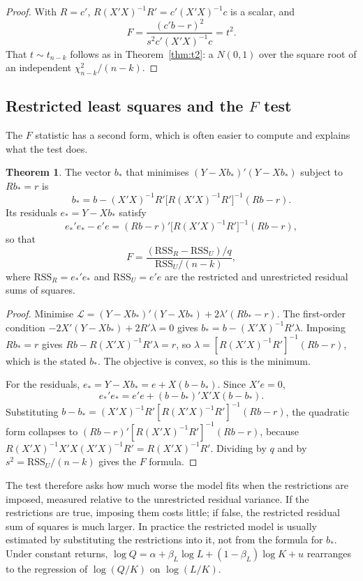 \documentclass[11pt,a4paper]{article}
\numberwithin{equation}{section}
\theoremstyle{definition}
\newtheorem{thm}{Theorem}[subsection]
\begin{document}
\begin{proof}
With $R = c'$, $R(X'X)^{-1}R' = c'(X'X)^{-1}c$ is a scalar, and
\[
F = \frac{(c'b - r)^2}{s^2c'(X'X)^{-1}c} = t^2 .
\]
 That $t \sim t_{n-k}$ follows as in
Theorem~\ref{thm:t2}: a $N(0, 1)$ over the square root of an independent $\chi^2_{n-k}/(n - k)$.
\end{proof}

\subsection{Restricted least squares and the $F$ test}
\label{ssec:restricted}

The $F$ statistic has a second form, which is often easier to compute and explains what the test does.

\begin{thm}
\label{thm:rls}
The vector $b_*$ that minimises $(Y - Xb_*)'(Y - Xb_*)$ subject to $Rb_* = r$ is
\[
b_* = b - (X'X)^{-1}R'\bigl[R(X'X)^{-1}R'\bigr]^{-1}(Rb - r) .
\]
Its residuals $e_* = Y - Xb_*$ satisfy
\[
e_*'e_* - e'e = (Rb - r)'\bigl[R(X'X)^{-1}R'\bigr]^{-1}(Rb - r) ,
\]
so that
\[
F = \frac{(\text{RSS}_R - \text{RSS}_U)/q}{\text{RSS}_U/(n - k)} ,
\]
where $\text{RSS}_R = e_*'e_*$ and $\text{RSS}_U = e'e$ are the restricted and unrestricted residual sums of squares.
\end{thm}

\begin{proof}
Minimise $\mathcal L = (Y - Xb_*)'(Y - Xb_*) + 2\lambda'(Rb_* - r)$. The first-order condition $-2X'(Y - Xb_*) + 2R'\lambda = 0$ gives
$b_* = b - (X'X)^{-1}R'\lambda$. Imposing $Rb_* = r$ gives $Rb - R(X'X)^{-1}R'\lambda = r$, so $\lambda = [R(X'X)^{-1}R']^{-1}(Rb - r)$, which is the
stated $b_*$. The objective is convex, so this is the minimum.

For the residuals, $e_* = Y - Xb_* = e + X(b - b_*)$. Since $X'e = 0$,
\[
e_*'e_* = e'e + (b - b_*)'X'X(b - b_*) .
\]
Substituting $b - b_* = (X'X)^{-1}R'[R(X'X)^{-1}R']^{-1}(Rb - r)$, the quadratic form collapses to
$(Rb - r)'[R(X'X)^{-1}R']^{-1}(Rb - r)$, because $R(X'X)^{-1}X'X(X'X)^{-1}R' = R(X'X)^{-1}R'$. Dividing by $q$ and by $s^2 = \text{RSS}_U/(n - k)$ gives the
$F$ formula.
\end{proof}

The test therefore asks how much worse the model fits when the restrictions are imposed, measured relative to the unrestricted residual variance.
If the restrictions are true, imposing them costs little; if false, the restricted residual sum of squares is much larger. In practice the restricted
model is usually estimated by substituting the restrictions into it, not from the formula for $b_*$. Under constant returns,
$\log Q = \alpha + \beta_L\log L + (1 - \beta_L)\log K + u$ rearranges to the regression of $\log(Q/K)$ on $\log(L/K)$.
\end{document}
